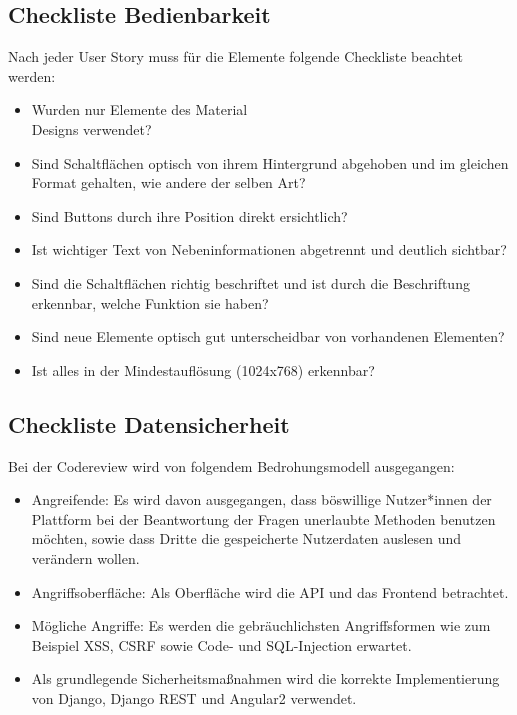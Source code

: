 \documentclass[accentcolor=tud0b,12pt,paper=a4]{tudreport}
\begin{document}
\subsection{Checkliste Bedienbarkeit}
Nach jeder User Story muss für die Elemente folgende Checkliste beachtet werden:
\begin{multicols}{2}
	\begin{itemize}
		\renewcommand{\labelitemi}{\scriptsize$\square$}
		\item Wurden nur Elemente des Material\\ Designs verwendet?
		\item Sind Schaltflächen optisch von ihrem Hintergrund abgehoben und im gleichen Format gehalten, wie andere der selben Art?
		\item Sind Buttons durch ihre Position direkt ersichtlich?
		\item Ist wichtiger Text von Nebeninformationen abgetrennt und deutlich sichtbar?
		\item Sind die Schaltflächen richtig beschriftet und ist durch die Beschriftung erkennbar, welche Funktion sie haben?
		\item Sind neue Elemente optisch gut unterscheidbar von vorhandenen Elementen?
		\item Ist alles in der Mindestauflösung (1024x768) erkennbar?
	\end{itemize}
\end{multicols}

\subsection{Checkliste Datensicherheit}
Bei der Codereview wird von folgendem Bedrohungsmodell ausgegangen:
\begin{multicols}{2}
\begin{itemize}
    \item Angreifende: Es wird davon ausgegangen, dass böswillige Nutzer*innen der Plattform bei der Beantwortung der Fragen unerlaubte Methoden benutzen möchten, sowie dass Dritte die gespeicherte Nutzerdaten auslesen und verändern wollen.
    \item Angriffsoberfläche: Als Oberfläche wird die API und das Frontend betrachtet.
    \item Mögliche Angriffe: Es werden die gebräuchlichsten Angriffsformen wie zum Beispiel XSS, CSRF sowie Code- und SQL-Injection erwartet.
    \item Als grundlegende Sicherheitsmaßnahmen wird die korrekte Implementierung von Django, Django REST und Angular2 verwendet.
\end{itemize}
\end{multicols}
\end{document}
